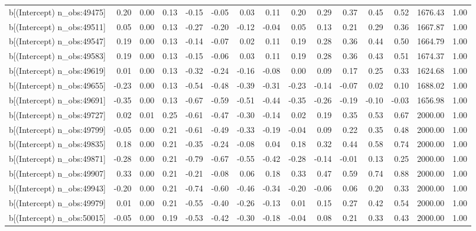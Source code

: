 \begin{table}[ht]
\begin{tabular}{rrrrrrrrrrrrrrr}
  b[(Intercept) n\_obs:49475] & 0.20 & 0.00 & 0.13 & -0.15 & -0.05 & 0.03 & 0.11 & 0.20 & 0.29 & 0.37 & 0.45 & 0.52 & 1676.43 & 1.00 \\ 
  b[(Intercept) n\_obs:49511] & 0.05 & 0.00 & 0.13 & -0.27 & -0.20 & -0.12 & -0.04 & 0.05 & 0.13 & 0.21 & 0.29 & 0.36 & 1667.87 & 1.00 \\ 
  b[(Intercept) n\_obs:49547] & 0.19 & 0.00 & 0.13 & -0.14 & -0.07 & 0.02 & 0.11 & 0.19 & 0.28 & 0.36 & 0.44 & 0.50 & 1664.79 & 1.00 \\ 
  b[(Intercept) n\_obs:49583] & 0.19 & 0.00 & 0.13 & -0.15 & -0.06 & 0.03 & 0.11 & 0.19 & 0.28 & 0.36 & 0.43 & 0.51 & 1674.37 & 1.00 \\ 
  b[(Intercept) n\_obs:49619] & 0.01 & 0.00 & 0.13 & -0.32 & -0.24 & -0.16 & -0.08 & 0.00 & 0.09 & 0.17 & 0.25 & 0.33 & 1624.68 & 1.00 \\ 
  b[(Intercept) n\_obs:49655] & -0.23 & 0.00 & 0.13 & -0.54 & -0.48 & -0.39 & -0.31 & -0.23 & -0.14 & -0.07 & 0.02 & 0.10 & 1688.02 & 1.00 \\ 
  b[(Intercept) n\_obs:49691] & -0.35 & 0.00 & 0.13 & -0.67 & -0.59 & -0.51 & -0.44 & -0.35 & -0.26 & -0.19 & -0.10 & -0.03 & 1656.98 & 1.00 \\ 
  b[(Intercept) n\_obs:49727] & 0.02 & 0.01 & 0.25 & -0.61 & -0.47 & -0.30 & -0.14 & 0.02 & 0.19 & 0.35 & 0.53 & 0.67 & 2000.00 & 1.00 \\ 
  b[(Intercept) n\_obs:49799] & -0.05 & 0.00 & 0.21 & -0.61 & -0.49 & -0.33 & -0.19 & -0.04 & 0.09 & 0.22 & 0.35 & 0.48 & 2000.00 & 1.00 \\ 
  b[(Intercept) n\_obs:49835] & 0.18 & 0.00 & 0.21 & -0.35 & -0.24 & -0.08 & 0.04 & 0.18 & 0.32 & 0.44 & 0.58 & 0.74 & 2000.00 & 1.00 \\ 
  b[(Intercept) n\_obs:49871] & -0.28 & 0.00 & 0.21 & -0.79 & -0.67 & -0.55 & -0.42 & -0.28 & -0.14 & -0.01 & 0.13 & 0.25 & 2000.00 & 1.00 \\ 
  b[(Intercept) n\_obs:49907] & 0.33 & 0.00 & 0.21 & -0.21 & -0.08 & 0.06 & 0.18 & 0.33 & 0.47 & 0.59 & 0.74 & 0.88 & 2000.00 & 1.00 \\ 
  b[(Intercept) n\_obs:49943] & -0.20 & 0.00 & 0.21 & -0.74 & -0.60 & -0.46 & -0.34 & -0.20 & -0.06 & 0.06 & 0.20 & 0.33 & 2000.00 & 1.00 \\ 
  b[(Intercept) n\_obs:49979] & 0.01 & 0.00 & 0.21 & -0.55 & -0.40 & -0.26 & -0.13 & 0.01 & 0.15 & 0.27 & 0.42 & 0.54 & 2000.00 & 1.00 \\ 
  b[(Intercept) n\_obs:50015] & -0.05 & 0.00 & 0.19 & -0.53 & -0.42 & -0.30 & -0.18 & -0.04 & 0.08 & 0.21 & 0.33 & 0.43 & 2000.00 & 1.00 \\ 

\end{tabular}
\end{table}
